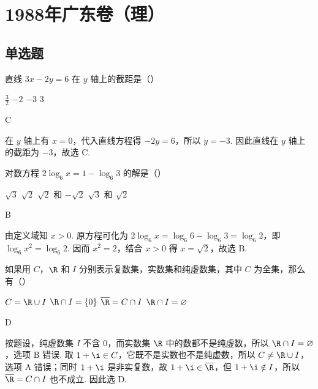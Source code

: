 \chapter{1988年广东卷（理）}

\section{单选题}

\begin{problem}
直线 \(3x - 2y = 6\) 在 \(y\) 轴上的截距是（\quad）

\choices
    {\(\frac{3}{2}\)}
    {\(-2\)}
    {\(-3\)}
    {\(3\)}
\end{problem}

\begin{answer}
C
\end{answer}

\begin{solution}
在 \(y\) 轴上有 \(x=0\)，代入直线方程得 \(-2y=6\)，所以 \(y=-3\). 因此直线在 \(y\) 轴上的截距为 \(-3\)，故选 C.
\end{solution}

\begin{problem}
对数方程 \(2\log_6 x = 1 - \log_6 3\) 的解是（\quad）

\choices
    {\(\sqrt{3}\)}
    {\(\sqrt{2}\)}
    {\(\sqrt{2}\) 和 \(-\sqrt{2}\)}
    {\(\sqrt{3}\) 和 \(\sqrt{2}\)}
\end{problem}

\begin{answer}
B
\end{answer}

\begin{solution}
由定义域知 \(x>0\). 原方程可化为 \(2\log_6x=\log_6 6-\log_6 3=\log_6 2\)，即 \(\log_6x^2=\log_6 2\). 因而 \(x^2=2\)，结合 \(x>0\) 得 \(x=\sqrt{2}\)，故选 B.
\end{solution}

\begin{problem}
如果用 \(C\)，\(\R\) 和 \(I\) 分别表示复数集，实数集和纯虚数集，其中 \(C\) 为全集，那么有（\quad）

\choices
    {\(C = \R \cup I\)}
    {\(\R \cap I = \{0\}\)}
    {\(\overline{\R} = C \cap I\)}
    {\(\R \cap I = \varnothing\)}
\end{problem}

\begin{answer}
D
\end{answer}

\begin{solution}
按题设，纯虚数集 \(I\) 不含 \(0\)，而实数集 \(\R\) 中的数都不是纯虚数，所以 \(\R\cap I=\varnothing\)，选项 B 错误. 取 \(1+\i\in C\)，它既不是实数也不是纯虚数，所以 \(C\ne\R\cup I\)，选项 A 错误；同时 \(1+\i\) 是非实复数，故 \(1+\i\in\overline{\R}\)，但 \(1+\i\notin I\)，所以 \(\overline{\R}=C\cap I\) 也不成立. 因此选 D.
\end{solution}

